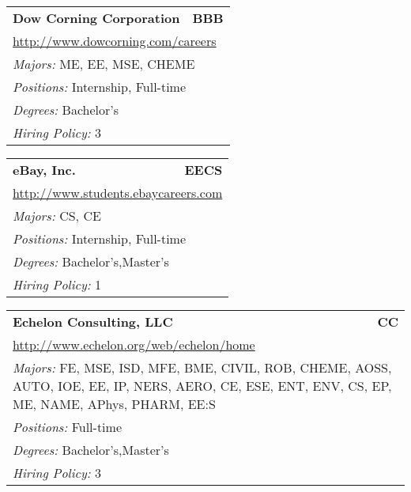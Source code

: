 \documentclass[twoside]{article}
\begin{document}
\begin{center}
\begin{multicols}{3}
\begin{FlushLeft}
\begin{minipage}{.9\columnwidth}
\end{minipage}
 
\begin{minipage}{.9\columnwidth}\begin{tabularx}{.95\columnwidth}{Xr}
                 {\Large\bf Dow Corning Corporation} & {\Large\bf BBB}\\
    \multicolumn{2}{p{.95\columnwidth}}{\url{http://www.dowcorning.com/careers}}\\
    \multicolumn{2}{p{.95\columnwidth}}{\emph{Majors:} ME, EE, MSE, CHEME}\\
    \multicolumn{2}{p{.95\columnwidth}}{\emph{Positions:} Internship, Full-time}\\
    \multicolumn{2}{p{.95\columnwidth}}{\emph{Degrees:} Bachelor's}\\
    \multicolumn{2}{p{.95\columnwidth}}{\emph{Hiring Policy:} 3}\\
    \end{tabularx}
    
\end{minipage}
 
\begin{minipage}{.9\columnwidth}\begin{tabularx}{.95\columnwidth}{Xr}
                 {\Large\bf eBay, Inc.} & {\Large\bf EECS}\\
    \multicolumn{2}{p{.95\columnwidth}}{\url{http://www.students.ebaycareers.com}}\\
    \multicolumn{2}{p{.95\columnwidth}}{\emph{Majors:} CS, CE}\\
    \multicolumn{2}{p{.95\columnwidth}}{\emph{Positions:} Internship, Full-time}\\
    \multicolumn{2}{p{.95\columnwidth}}{\emph{Degrees:} Bachelor's,Master's}\\
    \multicolumn{2}{p{.95\columnwidth}}{\emph{Hiring Policy:} 1}\\
    \end{tabularx}
    
\end{minipage}
 
\begin{minipage}{.9\columnwidth}\begin{tabularx}{.95\columnwidth}{Xr}
                 {\Large\bf Echelon Consulting, LLC} & {\Large\bf CC}\\
    \multicolumn{2}{p{.95\columnwidth}}{\url{http://www.echelon.org/web/echelon/home}}\\
    \multicolumn{2}{p{.95\columnwidth}}{\emph{Majors:} FE, MSE, ISD, MFE, BME, CIVIL, ROB, CHEME, AOSS, AUTO, IOE, EE, IP, NERS, AERO, CE, ESE, ENT, ENV, CS, EP, ME, NAME, APhys, PHARM, EE:S}\\
    \multicolumn{2}{p{.95\columnwidth}}{\emph{Positions:} Full-time}\\
    \multicolumn{2}{p{.95\columnwidth}}{\emph{Degrees:} Bachelor's,Master's}\\
    \multicolumn{2}{p{.95\columnwidth}}{\emph{Hiring Policy:} 3}\\
    \end{tabularx}
    

\end{minipage}
\end{FlushLeft}
\end{multicols}
\end{center}
\end{document}
